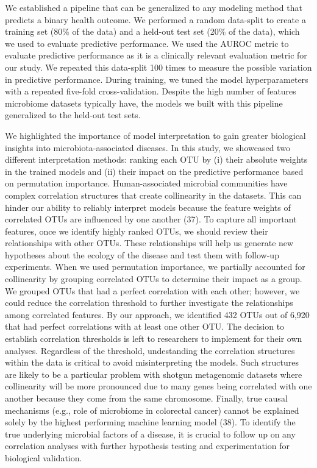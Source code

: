 \documentclass[
  11pt,
]{article}
\begin{document}
We established a pipeline that can be generalized to any modeling method
that predicts a binary health outcome. We performed a random data-split
to create a training set (80\% of the data) and a held-out test set
(20\% of the data), which we used to evaluate predictive performance. We
used the AUROC metric to evaluate predictive performance as it is a
clinically relevant evaluation metric for our study. We repeated this
data-split 100 times to measure the possible variation in predictive
performance. During training, we tuned the model hyperparameters with a
repeated five-fold cross-validation. Despite the high number of features
microbiome datasets typically have, the models we built with this
pipeline generalized to the held-out test sets.

We highlighted the importance of model interpretation to gain greater
biological insights into microbiota-associated diseases. In this study,
we showcased two different interpretation methods: ranking each OTU by
(i) their absolute weights in the trained models and (ii) their impact
on the predictive performance based on permutation importance.
Human-associated microbial communities have complex correlation
structures that create collinearity in the datasets. This can hinder our
ability to reliably interpret models because the feature weights of
correlated OTUs are influenced by one another (37). To capture all
important features, once we identify highly ranked OTUs, we should
review their relationships with other OTUs. These relationships will
help us generate new hypotheses about the ecology of the disease and
test them with follow-up experiments. When we used permutation
importance, we partially accounted for collinearity by grouping
correlated OTUs to determine their impact as a group. We grouped OTUs
that had a perfect correlation with each other; however, we could reduce
the correlation threshold to further investigate the relationships among
correlated features. By our approach, we identified 432 OTUs out of
6,920 that had perfect correlations with at least one other OTU. The
decision to establish correlation thresholds is left to researchers to
implement for their own analyses. Regardless of the threshold,
undestanding the correlation structures within the data is critical to
avoid misinterpreting the models. Such structures are likely to be a
particular problem with shotgun metagenomic datasets where collinearity
will be more pronounced due to many genes being correlated with one
another because they come from the same chromosome. Finally, true causal
mechanisms (e.g., role of microbiome in colorectal cancer) cannot be
explained solely by the highest performing machine learning model (38).
To identify the true underlying microbial factors of a disease, it is
crucial to follow up on any correlation analyses with further hypothesis
testing and experimentation for biological validation.
\end{document}
